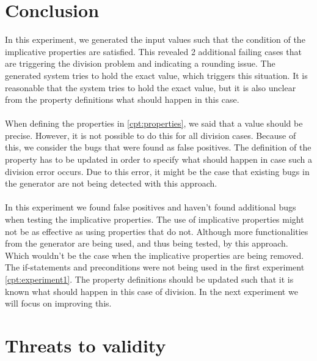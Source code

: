 \section{Conclusion}
In this experiment, we generated the input values such that the condition of
the implicative properties are satisfied. This revealed 2 additional
failing cases that are triggering the division problem and indicating a rounding issue. The generated system
tries to hold the exact value, which triggers this situation. It is reasonable
that the system tries to hold the exact value, but it is also unclear from the
property definitions what should happen in this case.\\
\\
When defining the properties in \autoref{cpt:properties}, we said that a value
should be precise. However, it is not possible to do this for all division
cases. Because of this, we consider the bugs that were found as false positives.
The definition of the property has to be updated in order to specify what should
happen in case such a division error occurs. Due to this error, it might be the
case that existing bugs in the generator are not being detected with this
approach.\\
\\
In this experiment we found false positives and haven't found additional bugs when testing the implicative properties.
The use of implicative properties might not be as effective as using properties
that do not. Although more functionalities from the generator are
being used, and thus being tested, by this approach. Which wouldn't be the case
when the implicative properties are being removed. The if-statements and
preconditions were not being used in the first experiment \autoref{cpt:experiment1}.
The property definitions should be updated such that it is known what should
happen in this case of division. In the next experiment we will focus on improving this.

\section{Threats to validity}

